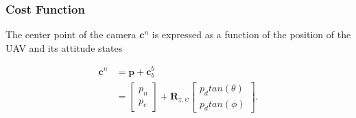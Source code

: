 \subsubsection*{Cost Function}

The center point of the camera $\mathbf{c}^n$ is expressed as a function of the position of the UAV and its attitude states

\begin{equation}
\begin{split}
	\mathbf{c}^n & = \mathbf{p} + \mathbf{c}_b^b \\
	& =
	\begin{bmatrix}
		p_n \\ p_e
	\end{bmatrix}
	+ \mathbf{R}_{z,\psi}
	\begin{bmatrix}
		p_d tan(\theta) \\ p_d tan(\phi)
	\end{bmatrix}.
\end{split}
\end{equation}